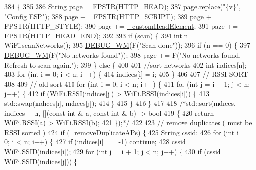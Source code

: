 \begin{DoxyCode}
384                                          \{
385 
386   String page = FPSTR(HTTP\_HEAD);
387   page.replace(\textcolor{stringliteral}{"\{v\}"}, \textcolor{stringliteral}{"Config ESP"});
388   page += FPSTR(HTTP\_SCRIPT);
389   page += FPSTR(HTTP\_STYLE);
390   page += \hyperlink{class_wi_fi_manager_a8860012564a62209d750c50e56319192}{\_customHeadElement};
391   page += FPSTR(HTTP\_HEAD\_END);
392 
393   \textcolor{keywordflow}{if} (scan) \{
394     \textcolor{keywordtype}{int} n = WiFi.scanNetworks();
395     \hyperlink{class_wi_fi_manager_ae5f595c670ccbcf9a191baf50f5c7c26}{DEBUG\_WM}(F(\textcolor{stringliteral}{"Scan done"}));
396     \textcolor{keywordflow}{if} (n == 0) \{
397       \hyperlink{class_wi_fi_manager_ae5f595c670ccbcf9a191baf50f5c7c26}{DEBUG\_WM}(F(\textcolor{stringliteral}{"No networks found"}));
398       page += F(\textcolor{stringliteral}{"No networks found. Refresh to scan again."});
399     \} \textcolor{keywordflow}{else} \{
400 
401       \textcolor{comment}{//sort networks}
402       \textcolor{keywordtype}{int} indices[n];
403       \textcolor{keywordflow}{for} (\textcolor{keywordtype}{int} i = 0; i < n; i++) \{
404         indices[i] = i;
405       \}
406 
407       \textcolor{comment}{// RSSI SORT}
408 
409       \textcolor{comment}{// old sort}
410       \textcolor{keywordflow}{for} (\textcolor{keywordtype}{int} i = 0; i < n; i++) \{
411         \textcolor{keywordflow}{for} (\textcolor{keywordtype}{int} j = i + 1; j < n; j++) \{
412           \textcolor{keywordflow}{if} (WiFi.RSSI(indices[j]) > WiFi.RSSI(indices[i])) \{
413             std::swap(indices[i], indices[j]);
414           \}
415         \}
416       \}
417 
418       \textcolor{comment}{/*std::sort(indices, indices + n, [](const int & a, const int & b) -> bool}
419 \textcolor{comment}{        \{}
420 \textcolor{comment}{        return WiFi.RSSI(a) > WiFi.RSSI(b);}
421 \textcolor{comment}{        \});*/}
422 
423       \textcolor{comment}{// remove duplicates ( must be RSSI sorted )}
424       \textcolor{keywordflow}{if} (\hyperlink{class_wi_fi_manager_a94d25bd8d02bbf0236d75dfd8ee682d7}{\_removeDuplicateAPs}) \{
425         String cssid;
426         \textcolor{keywordflow}{for} (\textcolor{keywordtype}{int} i = 0; i < n; i++) \{
427           \textcolor{keywordflow}{if} (indices[i] == -1) \textcolor{keywordflow}{continue};
428           cssid = WiFi.SSID(indices[i]);
429           \textcolor{keywordflow}{for} (\textcolor{keywordtype}{int} j = i + 1; j < n; j++) \{
430             \textcolor{keywordflow}{if} (cssid == WiFi.SSID(indices[j])) \{

\end{DoxyCode}
